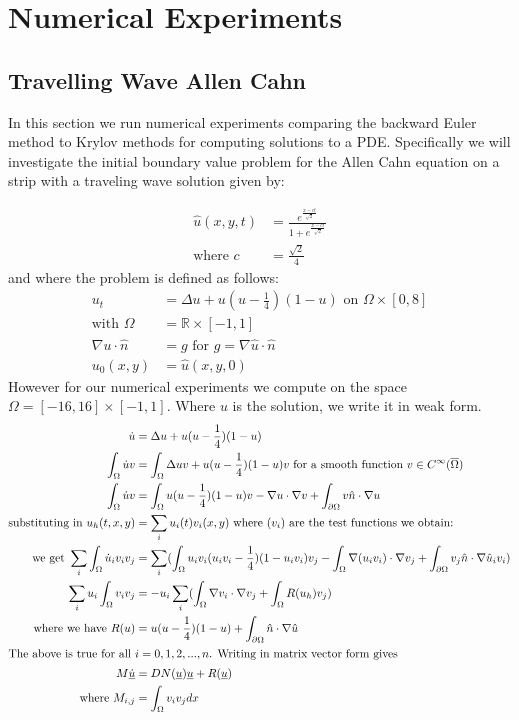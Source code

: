 \section{Numerical Experiments}

\subsection{Travelling Wave Allen Cahn}
In this section we run numerical experiments comparing the backward Euler method to Krylov methods for computing solutions to a PDE.
Specifically we will investigate the initial boundary value problem for the Allen Cahn equation on a strip with a traveling wave solution\cite{YukitakaFukao2004} given by:

\begin{align}
    \hat u(x,y,t)&=\frac{e^{\frac{x-ct}{\sqrt2}}}{1+e^{\frac{x-ct}{\sqrt2}}} \label{TravelingWaveSol}\\
    \text{where } c &= \frac{\sqrt{2}}{4}
\end{align}
and where the problem is defined as follows:
\begin{align*}
    u_t&=\Delta u+u(u-\frac14)(1-u) \text{ on $\Omega \times [0, 8]$}\\
    \text{with } \Omega &= \mathbb{R}\times[-1,1]\\
    \nabla u \cdot \hat n &= g \text{ for $g = \nabla \hat u \cdot \hat n$}\\
    u_0(x, y) &= \hat u(x,y, 0)
\end{align*}
However for our numerical experiments we compute on the space $\Omega=[-16,16]\times[-1,1]$.
Where $u$ is the solution, we write it in weak form.
\begin{align*}
    \dot u&=\Delta u+u(u-\frac14)(1-u)\\
    \int_{\Omega} \dot u v &=\int_{\Omega} \Delta uv+u(u-\frac14)(1-u)v \text{ for a smooth function $v \in C^{\infty}(\overline{\Omega})$}\\
    \int_{\Omega} \dot u v &=\int_{\Omega} u(u-\frac14)(1-u)v - \nabla u \cdot \nabla v + \int_{\partial\Omega}  v\hat n \cdot \nabla u\\
    \text{substituting in } u_h(t,x,y) &= \sum_i u_i(t) v_i(x,y) \text{ where $(v_i)$ are the test functions we obtain:}\\
    \text{we get } \sum_i\int_{\Omega} \dot u_i v_i v_j &=\sum_i(\int_{\Omega} u_iv_i(u_iv_i-\frac14)(1-u_iv_i)v_j - \int_{\Omega}\nabla (u_iv_i) \cdot \nabla v_j + \int_{\partial\Omega}  v_j\hat n \cdot \nabla \hat u_iv_i)\\
    \sum_iu_i\int_{\Omega}v_iv_j &= -u_i\sum_i(\int_{\Omega}\nabla v_i \cdot \nabla v_j + \int_{\Omega}R(u_h)v_j)\\
    \text{where we have } R(u)&=u(u-\frac14)(1-u) + \int_{\partial\Omega}  \hat n \cdot \nabla \hat  u\\
    \intertext{The above is true for all $i=0,1,2,...,n$. Writing in matrix vector form gives}
    M \underline{\dot u} &= DN(\underline{u})\underline{u} + R(\underline{u})\\
    \text{where } M_{i,j} &= \int_{\Omega}v_iv_jdx
\end{align*}
